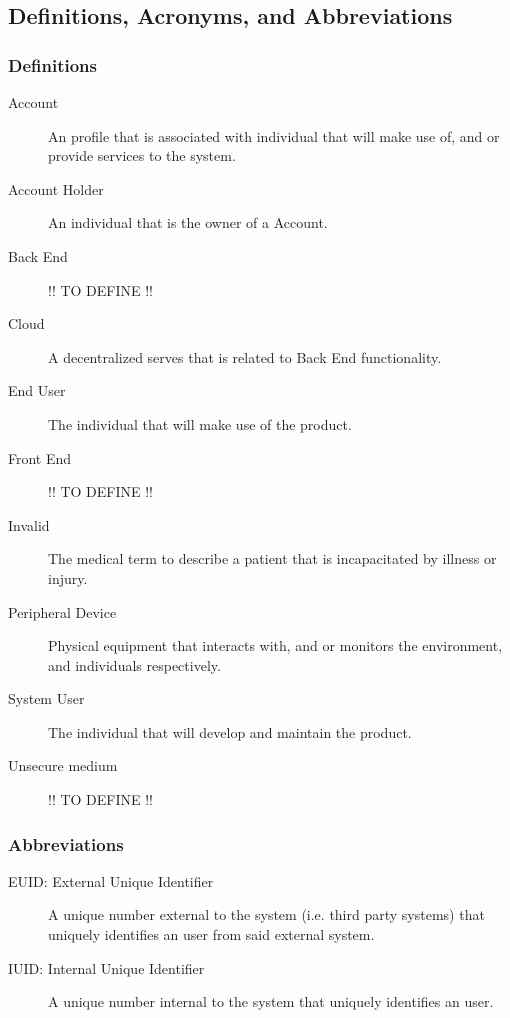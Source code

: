 \subsection{Definitions, Acronyms, and Abbreviations}
\subsubsection{Definitions}
	\begin{description}
		\item[Account] An profile that is associated with individual that will make use of, and or provide services to the system.
		\item[Account Holder] An individual that is the owner of a Account.
		\item[Back End] !! TO DEFINE !!
		\item[Cloud] A decentralized serves that is related to Back End functionality.
		\item[End User] The individual that will make use of the product.
		\item[Front End] !! TO DEFINE !!
		\item[Invalid] The medical term to describe a patient that is  incapacitated by illness or injury.
		\item[Peripheral Device]  Physical equipment that interacts with, and or monitors the environment, and individuals respectively.
		\item[System User] The individual that will develop and maintain the product.
		\item[Unsecure medium] !! TO DEFINE !!
	\end{description}
\subsubsection{Abbreviations}
	\begin{description}
		\item[EUID: External Unique Identifier] A unique number external to the system (i.e. third party systems) that uniquely identifies an user from said external system.
		\item[IUID: Internal Unique Identifier] A unique number internal to the system that uniquely identifies an user.
	\end{description}